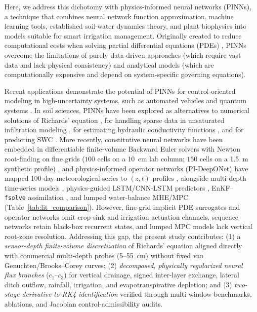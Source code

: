\documentclass[pdflatex,sn-nature]{sn-jnl}%
\theoremstyle{thmstyleone}%
\theoremstyle{thmstyletwo}%
\theoremstyle{thmstylethree}%
\begin{document}
Here, we address this dichotomy with physics-informed neural networks (PINNs), a technique that combines neural network function approximation, machine learning tools, established soil-water dynamics theory, and plant biophysics into models suitable for smart irrigation management. Originally created to reduce computational costs when solving partial differential equations (PDEs)  \cite{Cuomo2022}, PINNs overcome the limitations of purely data-driven approaches (which require vast data and lack physical consistency) and analytical models (which are computationally expensive and depend on system-specific governing equations).


Recent applications demonstrate the potential of PINNs for control-oriented modeling in high-uncertainty systems, such as automated vehicles and quantum systems \cite{Li2024, Zhang2025}. In soil sciences, PINNs have been explored as alternatives to numerical solutions of Richards' equation \cite{Bandai2022}, for handling sparse data in unsaturated infiltration modeling \cite{Lan2024}, for estimating hydraulic conductivity functions \cite{Elkha2024}, and for predicting SWC \cite{Bagheri2025}. More recently, constitutive neural networks have been embedded in differentiable finite-volume Backward Euler solvers with Newton root-finding on fine grids ($100$ cells on a \SI{10}{cm} lab column; $150$ cells on a \SI{1.5}{m} synthetic profile) \cite{Bandai2024}, and physics-informed operator networks (PI-DeepONet) have mapped 100-day meteorological series to $(z,t)$ profiles \cite{Ye2025}, alongside multi-depth time-series models \cite{Zou2010}, physics-guided LSTM/CNN-LSTM predictors \cite{WangY2023, ZhangT2025, Jiang2026}, EnKF--\texttt{fsolve} assimilation \cite{Jiang2025}, and lumped water-balance MHE/MPC \cite{condeforecast2024} (Table~\ref{tab:lit_comparison}). However, fine-grid implicit PDE surrogates and operator networks omit crop-sink and irrigation actuation channels, sequence networks retain black-box recurrent states, and lumped MPC models lack vertical root-zone resolution. Addressing this gap, the present study contributes: (1) a \emph{sensor-depth finite-volume discretization} of Richards' equation aligned directly with commercial multi-depth probes (5--55~\si{cm}) without fixed van Genuchten/Brooks--Corey curves; (2) \emph{decomposed, physically regularized neural flux branches} ($c_1$--$c_3$) for vertical drainage, signed inter-layer exchange, lateral ditch outflow, rainfall, irrigation, and evapotranspirative depletion; and (3) \emph{two-stage derivative-to-RK4 identification} verified through multi-window benchmarks, ablations, and Jacobian control-admissibility audits.
\end{document}
